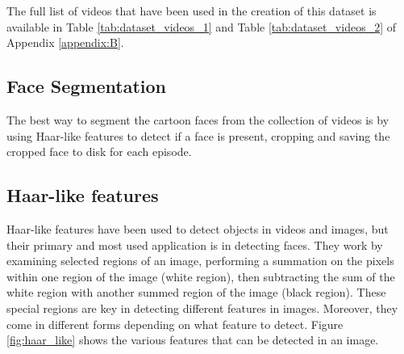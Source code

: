 \documentclass[report, 11pt, oneside]{dissertation}
\begin{document}
The full list of videos that have been used in the creation of this dataset is available in Table \ref{tab:dataset_videos_1} and Table \ref{tab:dataset_videos_2} of Appendix \ref{appendix:B}.

\subsection{Face Segmentation}

The best way to segment the cartoon faces from the collection of videos is by using Haar-like features to detect if a face is present, cropping and saving the cropped face to disk for each episode.

\subsection{Haar-like features}

Haar-like features have been used to detect objects in videos and images, but their primary and most used application is in detecting faces. They work by examining selected regions of an image, performing a summation on the pixels within one region of the image (white region), then subtracting the sum of the white region with another summed region of the image (black region). These special regions are key in detecting different features in images. Moreover, they come in different forms depending on what feature to detect. Figure \ref{fig:haar_like} shows the various features that can be detected in an image.
\end{document}
